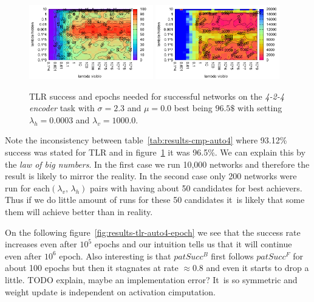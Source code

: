 \begin{figure}[H]
  \centering
  \includegraphics[width=0.48\textwidth]{img/tlr-auto4-success.pdf}   
  \includegraphics[width=0.48\textwidth]{img/tlr-auto4-epoch.pdf}     
  \caption{TLR success and epochs needed for successful networks on the \emph{4-2-4 encoder} task with $\sigma = 2.3$ and $\mu = 0.0$ best being $96.5\$$ with setting $\lambda_h=0.0003$ and $\lambda_v=1000.0$.}
  \label{fig:results-tlr-auto4-performance}
\end{figure}

Note the inconsistency between table~\ref{tab:results-cmp-auto4} where 93.12\% success was stated for TLR and in figure~\ref{fig:results-tlr-auto4-performance} it was 96.5\%. We can explain this by the \emph{law of big numbers}. In the first case we run 10,000 networks and therefore the result is likely to mirror the reality. In the second case only 200 networks were run for each$(\lambda_v,\,\lambda_h)$ pairs with having about 50 candidates for best achievers. Thus if we do little amount of runs for these 50 candidates it~is likely that some them will achieve better than in reality. 

On the following figure~\ref{fig:results-tlr-auto4-epoch} we see that the success rate increases even after $10^5$ epochs and our intuition tells us that it will continue even after $10^6$ epoch. Also interesting is that $patSucc^B$ first follows $patSucc^F$ for about 100 epochs but then it stagnates at rate $\approx0.8$ and even it starts to drop a little. TODO explain, maybe an implementation error? It~is so symmetric and weight update is independent on activation cimputation. 

